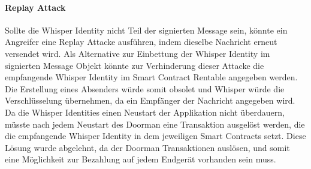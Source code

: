 \paragraph{Replay Attack}
Sollte die Whisper Identity nicht Teil der signierten Message sein, könnte ein Angreifer eine Replay Attacke ausführen, indem dieselbe Nachricht erneut versendet wird. Als Alternative zur Einbettung der Whisper Identity im signierten Message Objekt könnte zur Verhinderung dieser Attacke die empfangende Whisper Identity im Smart Contract Rentable angegeben werden. Die Erstellung eines Absenders würde somit obsolet und Whisper würde die Verschlüsselung übernehmen, da ein Empfänger der Nachricht angegeben wird. Da die Whisper Identities einen Neustart der Applikation nicht überdauern, müsste nach jedem Neustart des Doorman eine Transaktion ausgelöst werden, die die empfangende Whisper Identity in dem jeweiligen Smart Contracts setzt. Diese Lösung wurde abgelehnt, da der Doorman Transaktionen auslösen, und somit eine Möglichkeit zur Bezahlung auf jedem Endgerät vorhanden sein muss.